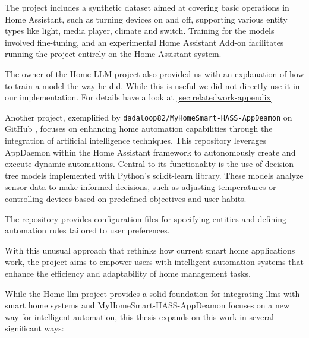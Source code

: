 The project includes a synthetic dataset aimed at covering basic operations in Home Assistant, such as turning devices on and off, supporting various entity types like light, media player, climate and switch. Training for the models involved fine-tuning, and an experimental Home Assistant Add-on facilitates running the project entirely on the Home Assistant system.

The owner of the Home LLM project also provided us with an explanation of how to train a model the way he did. While this is useful we did not directly use it in our implementation. For details have a look at \cref{sec:relatedwork-appendix}

Another project, exemplified by \texttt{dadaloop82/MyHomeSmart-HASS-AppDeamon} on GitHub \cite{dadaloop82_MyHomeSmart_HASS_AppDeamon}, focuses on enhancing home automation capabilities through the integration of artificial intelligence techniques. This repository leverages AppDaemon within the Home Assistant framework to autonomously create and execute dynamic automations. Central to its functionality is the use of decision tree models implemented with Python's scikit-learn library. These models analyze sensor data to make informed decisions, such as adjusting temperatures or controlling devices based on predefined objectives and user habits.

The repository provides configuration files for specifying entities and defining automation rules tailored to user preferences.

With this unusual approach that rethinks how current smart home applications work, the project aims to empower users with intelligent automation systems that enhance the efficiency and adaptability of home management tasks.

While the Home \gls{llm} project provides a solid foundation for integrating \glspl{llm} with smart home systems and MyHomeSmart-HASS-AppDeamon focuses on a new way for intelligent automation, this thesis expands on this work in several significant ways:

